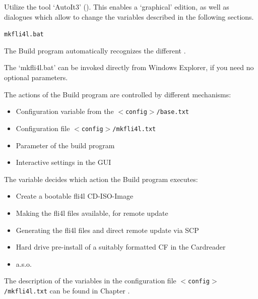 
  Utilize the tool `AutoIt3' (). This enables a
  `graphical' edition, as well as dialogues which allow to change the variables described in the following
   sections.


  \begin{description}
    \item \texttt{mkfli4l.bat}
  \end{description}


  The Build program automatically recognizes the different .

  The `mkfli4l.bat' can be invoked directly from Windows Explorer, if you need no
  optional parameters.

   The actions of the Build program are controlled by different mechanisms:
  \begin{itemize}
    \item Configuration variable  from the
          \texttt{$<$config$>$/base.txt}
    \item Configuration file \texttt{$<$config$>$/mkfli4l.txt}
    \item Parameter of the build program
    \item Interactive settings in the GUI
  \end{itemize}

  The variable  decides which action
  the Build program executes:
  \begin{itemize}
    \item Create a bootable fli4l CD-ISO-Image
    \item Making the fli4l files available, for remote update
    \item Generating the fli4l files and direct remote update via SCP
    \item Hard drive pre-install of a suitably formatted CF in the Cardreader
    \item a.s.o.
  \end{itemize}

  The description of the variables in the configuration file
  \texttt{$<$config$>$/mkfli4l.txt} can be found in Chapter
  .

